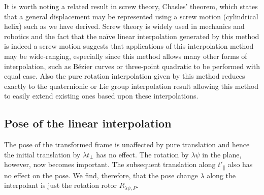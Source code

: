 It is worth noting a related result in screw theory, Chasles' theorem, which
states that a general displacement may be represented using a screw motion
(cylindrical helix) such as we have derived. Screw theory is widely used in
mechanics and robotics and the fact that the na\"ive linear interpolation
generated by this method is indeed a screw motion suggests that
applications of this interpolation method may be wide-ranging, especially since
this method allows many other forms of interpolation, such as B\'ezier curves
or three-point quadratic to be performed with equal ease. Also the pure
rotation interpolation given by this method reduces exactly to the quaternionic
or Lie group interpolation result allowing this method to easily extend
existing ones based upon these interpolations.

\subsection{Pose of the linear interpolation}

The pose of the transformed frame is unaffected by pure translation and hence the initial
translation by $\lambda t_\perp$ has no effect. The rotation by $\lambda \psi$ in the plane,
however, now becomes important. The subsequent translation along $t'_\parallel$ also has
no effect on the pose. We find, therefore, that the pose change $\lambda$ along the 
interpolant is just the rotation rotor $R_{\lambda \psi, P}$.



